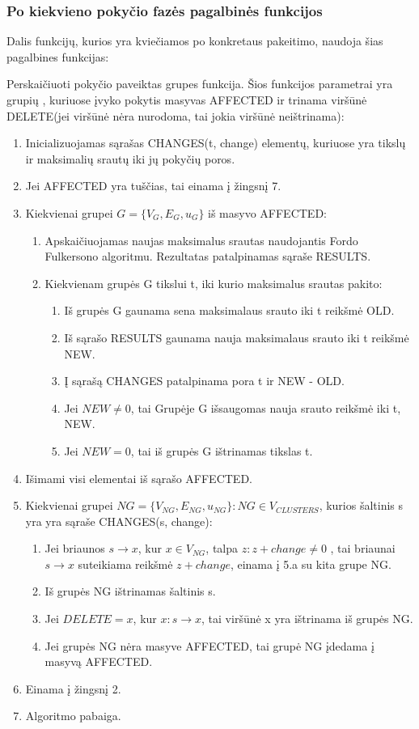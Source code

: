 \subsubsection{Po kiekvieno pokyčio fazės pagalbinės funkcijos}

Dalis funkcijų, kurios yra kviečiamos po konkretaus pakeitimo, naudoja šias pagalbines funkcijas:

Perskaičiuoti pokyčio paveiktas grupes funkcija. Šios funkcijos parametrai yra grupių , kuriuose įvyko pokytis masyvas AFFECTED ir trinama viršūnė  DELETE(jei viršūnė nėra nurodoma, tai jokia viršūnė neištrinama):
\begin{enumerate}
	\item Inicializuojamas sąrašas CHANGES(t, change) elementų, kuriuose yra tikslų ir maksimalių srautų iki jų pokyčių poros.
	\item Jei AFFECTED yra tuščias, tai einama į žingsnį 7.
	\item Kiekvienai grupei $G=\{V_G, E_G, u_G\}$ iš masyvo AFFECTED:
	\begin{enumerate}
		\item Apskaičiuojamas naujas maksimalus srautas naudojantis Fordo Fulkersono algoritmu. Rezultatas patalpinamas sąraše RESULTS.
		\item Kiekvienam grupės G tikslui t, iki kurio maksimalus srautas pakito:
		\begin{enumerate}
			\item Iš grupės G gaunama sena maksimalaus srauto iki t reikšmė OLD.
			\item Iš sąrašo RESULTS gaunama nauja maksimalaus srauto iki t reikšmė NEW.
			\item Į sąrašą CHANGES patalpinama pora t ir NEW - OLD.
			\item Jei $NEW \neq 0$, tai Grupėje G išsaugomas nauja srauto reikšmė iki t, NEW.
			\item Jei $NEW = 0$, tai iš grupės G ištrinamas tikslas t.
		\end{enumerate}
	\end{enumerate}
	\item Išimami visi elementai iš sąrašo AFFECTED.
	\item Kiekvienai grupei $NG=\{V_{NG}, E_{NG}, u_{NG}\} : NG \in V_{CLUSTERS}$, kurios šaltinis s yra yra sąraše CHANGES(s, change):
	\begin{enumerate}
		\item Jei briaunos $s \rightarrow x$, kur $x \in V_{NG}$, talpa $z : z + change  \neq 0$ , tai briaunai $s \rightarrow x$ suteikiama reikšmė $z + change$, einama į 5.a su kita grupe NG.
		\item Iš grupės NG ištrinamas šaltinis s.
		\item Jei $DELETE  = x$, kur $x : s \rightarrow x$, tai viršūnė x yra ištrinama iš grupės NG.
		\item Jei grupės NG nėra masyve AFFECTED, tai grupė NG įdedama į masyvą AFFECTED.
	\end{enumerate}
	\item Einama į žingsnį  2.
	\item Algoritmo pabaiga. 
\end{enumerate}

